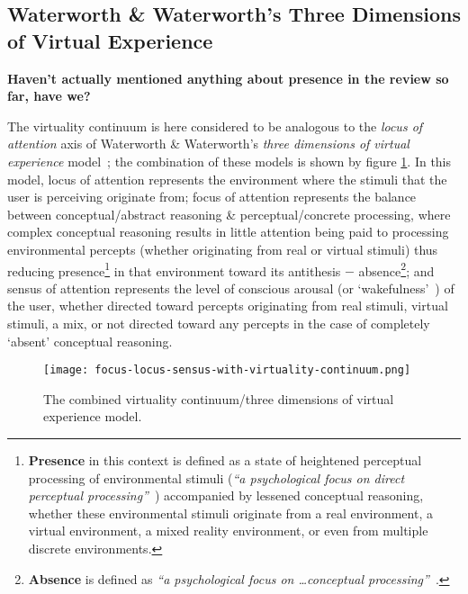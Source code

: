 \subsection{Waterworth \& Waterworth's Three Dimensions of Virtual Experience}
\newcommand{\presencefootnote}{\footnote{\textbf{Presence} in this context is defined as a state of heightened perceptual processing of environmental stimuli (\textit{``a psychological focus on direct perceptual processing''}~\cite{Waterworth2001}) accompanied by lessened conceptual reasoning, whether these environmental stimuli originate from a real environment, a virtual environment, a mixed reality environment, or even from multiple discrete environments.}}

\newcommand{\absencefootnote}{\footnote{\textbf{Absence} is defined as \textit{``a psychological focus on \ldots conceptual processing''}~\cite{Waterworth2001}.}}

\textbf{Haven't actually mentioned anything about presence in the review so far, have we?}

The virtuality continuum is here considered to be analogous to the \textit{locus of attention} axis of Waterworth \& Waterworth's \textit{three dimensions of virtual experience} model~\cite{Waterworth2001}; the combination of these models is shown by figure \ref{focus-locus-sensus-with-virtuality-continuum}. In this model, locus of attention represents the environment where the stimuli that the user is perceiving originate from; focus of attention represents the balance between conceptual/abstract reasoning \& perceptual/concrete processing, where complex conceptual reasoning results in little attention being paid to processing environmental percepts (whether originating from real or virtual stimuli) thus reducing presence\presencefootnote{} in that environment toward its antithesis $-$ absence\absencefootnote{}; and sensus of attention represents the level of conscious arousal (or `wakefulness'~\cite{Laureys2009}) of the user, whether directed toward percepts originating from real stimuli, virtual stimuli, a mix, or not directed toward any percepts in the case of completely `absent' conceptual reasoning.

\begin{figure}[h]
	\begin{center}
		\texttt{[image: focus-locus-sensus-with-virtuality-continuum.png]}
		\caption{The combined virtuality continuum/three dimensions of virtual experience model.}
		\label{focus-locus-sensus-with-virtuality-continuum}
	\end{center}	
\end{figure}

